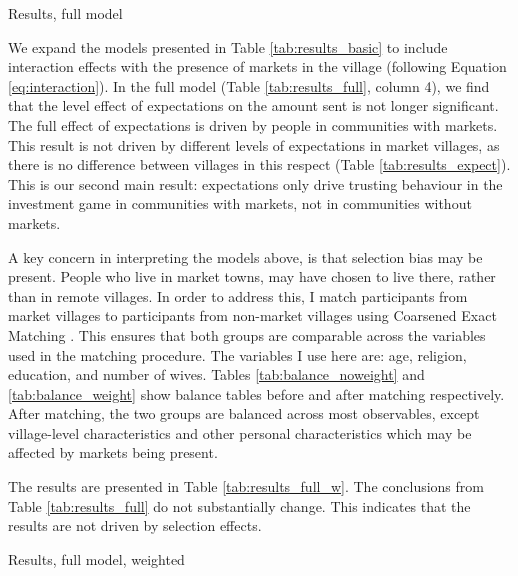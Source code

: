 \begin{threeparttable}[htb]
	\small
	\caption{Results, full model}
	\label{tab:results_full}
	\centering
	
	\begin{tablenotes}
		\notes
	\end{tablenotes}
\end{threeparttable}

We expand the models presented in Table \ref{tab:results_basic} to include interaction effects with the presence of markets in the village (following Equation \ref{eq:interaction}). In the full model (Table \ref{tab:results_full}, column 4), we find that the level effect of expectations on the amount sent is not longer significant. The full effect of expectations is driven by people in communities with markets. This result is not driven by different levels of expectations in market villages, as there is no difference between villages in this respect (Table \ref{tab:results_expect}). This is our second main result: expectations only drive trusting behaviour in the investment game in communities with markets, not in communities without markets.

A key concern in interpreting the models above, is that selection bias may be present. People who live in market towns, may have chosen to live there, rather than in remote villages. In order to address this, I match participants from market villages to participants from non-market villages using Coarsened Exact Matching \citep{Blackwell2010}. This ensures that both groups are comparable across the variables used in the matching procedure. The variables I use here are: age, religion, education, and number of wives. Tables \ref{tab:balance_noweight} and \ref{tab:balance_weight} show balance tables before and after matching respectively. After matching, the two groups are balanced across most observables, except village-level characteristics and other personal characteristics which may be affected by markets being present.

The results are presented in Table \ref{tab:results_full_w}. The conclusions from Table \ref{tab:results_full} do not substantially change. This indicates that the results are not driven by selection effects.

\begin{table}[htb]
	\small
	\caption{Results, full model, weighted}
	\label{tab:results_full_w}
	\begin{center}
	
	\end{center}
\end{table}


